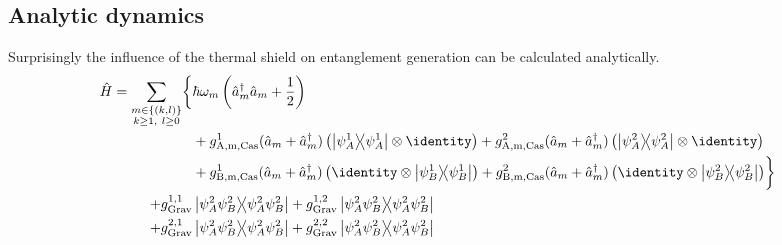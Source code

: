 \subsection{Analytic dynamics}
Surprisingly the influence of the thermal shield on entanglement generation can be calculated analytically.
\begin{align}\label{eq:5:hamiltonian}
  \begin{split}
    \op{H} = \sum_{\substack{m\in\{(k,l)\}\\ k \geq 1,\ l \geq 0}} \biggl\{ & \hbar \omega_m \left(\op{a}^\dagger_m \op{a}_m + \frac{1}{2}\right) \\
    &+ g^1_\mathrm{A,m,Cas}(\op{a}_m + \op{a}^\dagger_m) \left( \ketbra{\psi^1_A} \otimes \identity \right)
     + g^2_\mathrm{A,m,Cas}(\op{a}_m + \op{a}^\dagger_m) \left( \ketbra{\psi^2_A} \otimes \identity \right) \\
    &+ g^1_\mathrm{B,m,Cas}(\op{a}_m + \op{a}^\dagger_m) \left( \identity \otimes \ketbra{\psi^1_B} \right)
     + g^2_\mathrm{B,m,Cas}(\op{a}_m + \op{a}^\dagger_m) \left( \identity \otimes \ketbra{\psi^2_B} \right)\biggr\} \\
    + g^{1,1}_\mathrm{Grav}&\ketbra{\psi^2_A \psi^2_B} + g^{1,2}_\mathrm{Grav}\ketbra{\psi^2_A \psi^2_B} \\
    + g^{2,1}_\mathrm{Grav}&\ketbra{\psi^2_A \psi^2_B} + g^{2,2}_\mathrm{Grav}\ketbra{\psi^2_A \psi^2_B}
  \end{split}
\end{align}
